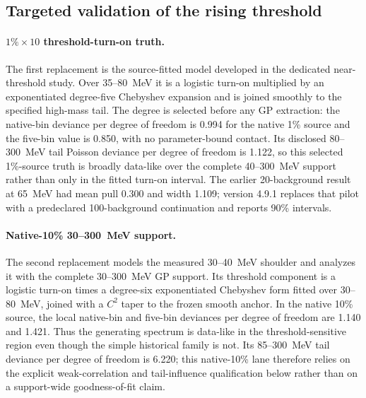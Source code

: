 \subsection{Targeted validation of the rising threshold}
\label{sec:v491-threshold-validation}

\paragraph{$1\%\times10$ threshold-turn-on truth.}
The first replacement is the source-fitted model developed in the dedicated
near-threshold study.  Over 35--80~MeV it is a logistic turn-on multiplied by an exponentiated
degree-five Chebyshev expansion and is joined smoothly to the specified high-mass tail.
The degree is selected before any GP extraction: the native-bin deviance per degree of
freedom is 0.994 for the native 1\% source and the five-bin value is 0.850, with no
parameter-bound contact.  Its disclosed 80--300~MeV tail Poisson deviance per degree
of freedom is 1.122, so this selected 1\%-source truth is broadly data-like over the
complete 40--300~MeV support rather than only in the fitted turn-on interval.  The
earlier 20-background result at 65~MeV had mean pull
0.300 and width 1.109; version 4.9.1 replaces that pilot with a predeclared
100-background continuation and reports 90\% intervals.

\paragraph{Native-10\% 30--300~MeV support.}
The second replacement models the measured 30--40~MeV shoulder and analyzes it with
the complete 30--300~MeV GP support.  Its threshold component is a logistic turn-on
times a degree-six exponentiated Chebyshev form fitted over 30--80~MeV, joined with a
$C^2$ taper to the frozen smooth anchor.  In the native 10\% source, the local
native-bin and five-bin deviances per degree of freedom are 1.140 and 1.421.  Thus the
generating spectrum is data-like in the threshold-sensitive region even though the
simple historical family is not.  Its 85--300~MeV tail deviance per degree of freedom
is 6.220; this native-10\% lane therefore relies on the explicit weak-correlation and
tail-influence qualification below rather than on a support-wide goodness-of-fit
claim.

